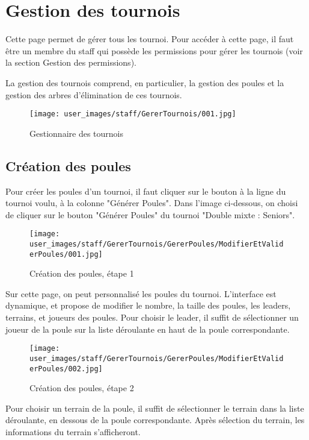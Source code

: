 \section{Gestion des tournois}

Cette page permet de gérer tous les tournoi. Pour accéder à cette page, il faut être un membre du staff qui possède les permissions pour gérer les tournois (voir la section Gestion des permissions). \newline

La gestion des tournois comprend, en particulier, la gestion des poules et la gestion des arbres d'élimination de ces tournois.

\begin{figure}[H]
\centering
\texttt{[image: user\_images/staff/GererTournois/001.jpg]}
\caption{Gestionnaire des tournois}
\end{figure}

\subsection{Création des poules}

Pour créer les poules d'un tournoi, il faut cliquer sur le bouton à la ligne du tournoi voulu, à la colonne "Générer Poules". Dans l'image ci-dessous, on choisi de cliquer sur le bouton "Générer Poules" du tournoi "Double mixte : Seniors".

\begin{figure}[H]
\centering
\texttt{[image: user\_images/staff/GererTournois/GererPoules/ModifierEtValiderPoules/001.jpg]}
\caption{Création des poules, étape 1}
\end{figure}

Sur cette page, on peut personnalisé les poules du tournoi. L'interface est dynamique, et propose de modifier le nombre, la taille des poules, les leaders, terrains, et joueurs des poules. Pour choisir le leader, il suffit de sélectionner un joueur de la poule sur la liste déroulante en haut de la poule correspondante.

\begin{figure}[H]
\centering
\texttt{[image: user\_images/staff/GererTournois/GererPoules/ModifierEtValiderPoules/002.jpg]}
\caption{Création des poules, étape 2}
\end{figure}

Pour choisir un terrain de la poule, il suffit de sélectionner le terrain dans la liste déroulante, en dessous de la poule correspondante. Après sélection du terrain, les informations du terrain s'afficheront.

